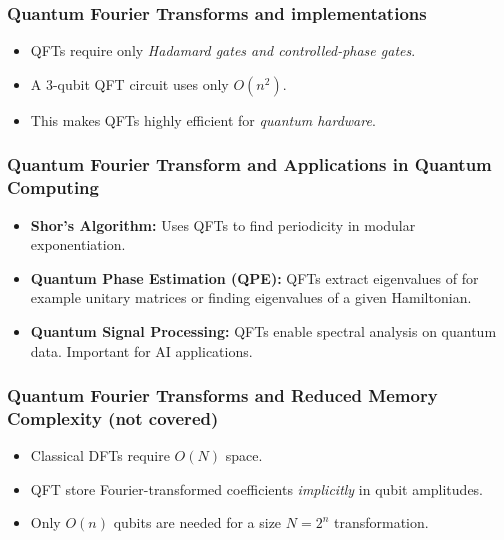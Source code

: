 \documentclass{beamer}
\begin{document}
\begin{frame}
\frametitle{Quantum Fourier Transforms and implementations}

\begin{itemize}
\item QFTs require only \emph{Hadamard gates and controlled-phase gates}.

\item A 3-qubit QFT circuit uses only $O(n^2)$.

\item This makes QFTs highly efficient for \emph{quantum hardware}.
\end{itemize}

\noindent
\end{frame}

\begin{frame}
\frametitle{Quantum Fourier Transform and Applications in Quantum Computing}

\begin{itemize}
\item \textbf{Shor’s Algorithm:} Uses QFTs to find periodicity in modular exponentiation.

\item \textbf{Quantum Phase Estimation (QPE):} QFTs extract eigenvalues of for example unitary matrices or finding eigenvalues of a given Hamiltonian.

\item \textbf{Quantum Signal Processing:} QFTs enable spectral analysis on quantum data. Important for AI applications.
\end{itemize}

\noindent
\end{frame}

\begin{frame}
\frametitle{Quantum Fourier Transforms and Reduced Memory Complexity (not covered)}

\begin{itemize}
\item Classical DFTs require $O(N)$ space.

\item QFT store Fourier-transformed coefficients \emph{implicitly} in qubit amplitudes.

\item Only $O(n)$ qubits are needed for a size $N = 2^n$ transformation.
\end{itemize}

\noindent
\end{frame}
\end{document}
